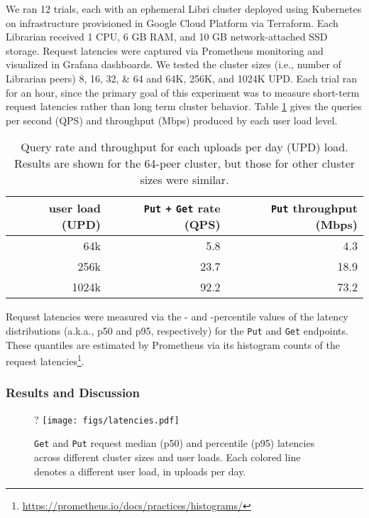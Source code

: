 \documentclass[10pt]{article}
\newcommand{\ttt}[1]{\texttt{#1}}
\def\Put{\ttt{Put}}
\def\Get{\ttt{Get}}
\begin{document}
We ran 12 trials, each with an ephemeral Libri cluster deployed using Kubernetes on infrastructure provisioned in Google Cloud Platform via Terraform. Each Librarian received 1 CPU, 6 GB RAM, and 10 GB network-attached SSD storage. Request latencies were captured via Prometheus monitoring and visualized in Grafana dashboards. We tested the cluster sizes (i.e., number of Librarian peers) 8, 16, 32, \& 64 and 64K, 256K, and 1024K UPD. Each trial ran for an hour, since the primary goal of this experiment was to measure short-term request latencies rather than long term cluster behavior. Table \ref{tbl:updload} gives the queries per second (QPS) and throughput (Mbps) produced by each user load level. 

\begin{table}[t]
\centering
\begin{tabular}{rrr}
	\toprule
	user load (UPD) & \Put{} \ttt{+} \Get{} rate (QPS) & \Put{} throughput (Mbps) \\ \midrule
	64k & 5.8 & 4.3 \\
	256k & 23.7 & 18.9 \\
	1024k & 92.2 & 73.2 \\ \bottomrule
\end{tabular}
\caption{Query rate and throughput for each uploads per day (UPD) load. Results are shown for the 64-peer cluster, but those for other cluster sizes were similar.}
\label{tbl:updload}
\end{table}

Request latencies were measured via the - and -percentile values of the latency distributions (a.k.a., p50 and p95, respectively) for the \ttt{Put} and \texttt{Get} endpoints. These quantiles are estimated by Prometheus via its histogram counts of the request latencies\footnote{\url{https://prometheus.io/docs/practices/histograms/}}.  

\subsubsection{Results and Discussion}

\begin{figure}?
	\centering
	\texttt{[image: figs/latencies.pdf]}
	\caption{\Get{} and \Put{} request median (p50) and  percentile (p95) latencies across different cluster sizes and user loads. Each colored line denotes a different user load, in uploads per day.}
	\label{fig:latencies}
\end{figure}
\end{document}
